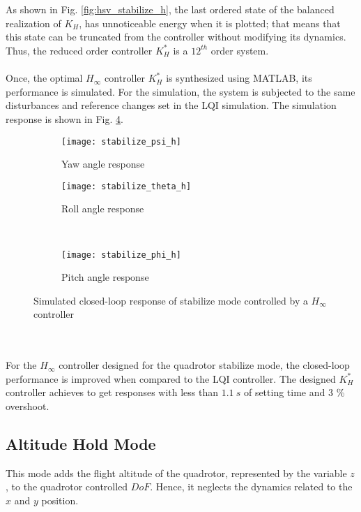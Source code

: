 \\\\
As shown in Fig. \ref{fig:hsv_stabilize_h}, the last ordered state of the balanced realization of $K_H$, has unnoticeable energy when it is plotted; that means that this state can be truncated from the controller without modifying its dynamics. Thus, the reduced order controller $K_{H}^{*}$ is a $12^{th}$ order system.
\\\\
Once, the optimal $H_\infty$ controller $K_{H}^{*}$ is synthesized using MATLAB, its performance is simulated. For the simulation, the system is subjected to the same disturbances and reference changes set in the LQI simulation. The simulation response is shown in Fig. \ref{fig:stabilize_h}.
\begin{figure}[h]
\begin{subfigure}{.5\linewidth}
\centering
\texttt{[image: stabilize\_psi\_h]}
\caption{Yaw angle response}
\label{fig:stabilize_psi_h}
\end{subfigure}%
\begin{subfigure}{.5\linewidth}
\centering
\texttt{[image: stabilize\_theta\_h]}
\caption{Roll angle response}
\label{fig:stabilize_theta_h}
\end{subfigure}\\[1ex]
\begin{subfigure}{\linewidth}
\centering
\texttt{[image: stabilize\_phi\_h]}
\caption{Pitch angle response}
\label{fig:stabilize_psi_h}
\end{subfigure}
\caption{Simulated closed-loop response of stabilize mode controlled by a $H_\infty$ controller}
\label{fig:stabilize_h}
\end{figure}
\\\\For the $H_\infty$ controller designed for the quadrotor stabilize mode, the closed-loop performance is improved when compared to the LQI controller. The designed $K_H^{*}$ controller achieves to get responses with less than $1.1\ s$ of setting time and $3$ \% overshoot.

\subsection{Altitude Hold Mode}
This mode adds the flight altitude of the quadrotor, represented by the variable $z$, to the quadrotor controlled $DoF$. Hence, it neglects the dynamics related to the $x$ and $y$ position.
